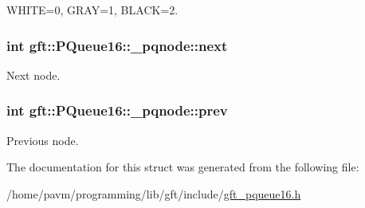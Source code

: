 W\-H\-I\-T\-E=0, G\-R\-A\-Y=1, B\-L\-A\-C\-K=2. 

\hypertarget{structgft_1_1PQueue16_1_1__pqnode_ae134e5ac0719e6f167a30bc0f6db8c82}{
\subsubsection[{next}]{\setlength{\rightskip}{0pt plus 5cm}int gft\-::\-P\-Queue16\-::\-\_\-pqnode\-::next}}\label{structgft_1_1PQueue16_1_1__pqnode_ae134e5ac0719e6f167a30bc0f6db8c82}


Next node. 

\hypertarget{structgft_1_1PQueue16_1_1__pqnode_a3f2d4b2b31360fd45e1f61cde5ebec41}{
\subsubsection[{prev}]{\setlength{\rightskip}{0pt plus 5cm}int gft\-::\-P\-Queue16\-::\-\_\-pqnode\-::prev}}\label{structgft_1_1PQueue16_1_1__pqnode_a3f2d4b2b31360fd45e1f61cde5ebec41}


Previous node. 



The documentation for this struct was generated from the following file\-:\begin{DoxyCompactItemize}
\item 
/home/pavm/programming/lib/gft/include/\hyperlink{gft__pqueue16_8h}{gft\-\_\-pqueue16.\-h}\end{DoxyCompactItemize}

